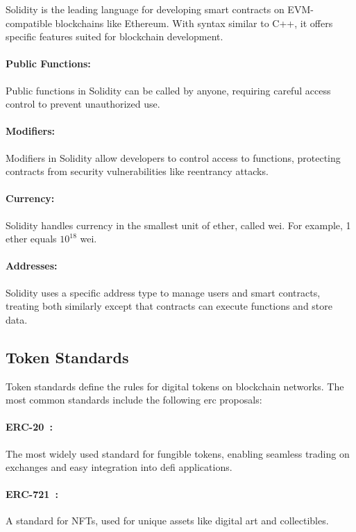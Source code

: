 Solidity is the leading language for developing smart contracts on
EVM-compatible blockchains like Ethereum. With syntax similar to C++, it offers
specific features suited for blockchain development.

\paragraph{Public Functions:}
Public functions in Solidity can be called by anyone, requiring careful access
control to prevent unauthorized use.

\paragraph{Modifiers:}
Modifiers in Solidity allow developers to control access to functions,
protecting contracts from security vulnerabilities like reentrancy attacks.

\paragraph{Currency:}
Solidity handles currency in the smallest unit of ether, called wei. For
example, 1 ether equals $10^{18}$ wei.

\paragraph{Addresses:}
Solidity uses a specific address type to manage users and smart contracts,
treating both similarly except that contracts can execute functions and store
data.

\subsection{Token Standards}\label{subsec:token_standards}

Token standards define the rules for digital tokens on blockchain networks. The
most common standards include the following \gls{erc} proposals:

\paragraph{ERC-20~\cite{erc20}:}
The most widely used standard for fungible tokens, enabling seamless trading on
exchanges and easy integration into \gls{defi} applications.

\paragraph{ERC-721~\cite{erc721}:}
A standard for NFTs, used for unique assets like digital art and collectibles.

